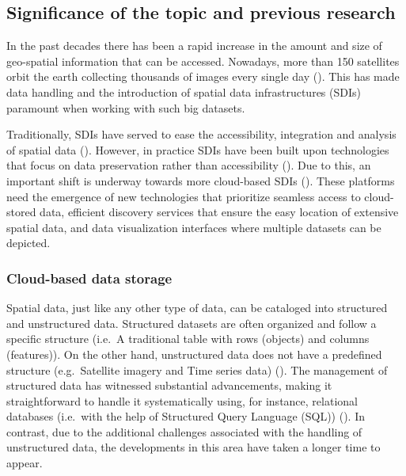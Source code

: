 \documentclass[
  oneside,
  open=any]{scrbook}
\begin{document}
\subsection{Significance of the topic and previous
research}\label{significance-of-the-topic-and-previous-research}

In the past decades there has been a rapid increase in the amount and
size of geo-spatial information that can be accessed. Nowadays, more
than 150 satellites orbit the earth collecting thousands of images every
single day (). This
has made data handling and the introduction of spatial data
infrastructures (SDIs) paramount when working with such big datasets.

Traditionally, SDIs have served to ease the accessibility, integration
and analysis of spatial data
(). However, in practice SDIs have been built upon technologies that
focus on data preservation rather than accessibility
(). Due to this,
an important shift is underway towards more cloud-based SDIs
(). These
platforms need the emergence of new technologies that prioritize
seamless access to cloud-stored data, efficient discovery services that
ensure the easy location of extensive spatial data, and data
visualization interfaces where multiple datasets can be depicted.

\subsubsection*{Cloud-based data
storage}\label{cloud-based-data-storage}

Spatial data, just like any other type of data, can be cataloged into
structured and unstructured data. Structured datasets are often
organized and follow a specific structure (i.e.~A traditional table with
rows (objects) and columns (features)). On the other hand, unstructured
data does not have a predefined structure (e.g.~Satellite imagery and
Time series data) (). The management of structured data has witnessed
substantial advancements, making it straightforward to handle it
systematically using, for instance, relational databases (i.e.~with the
help of Structured Query Language (SQL))
(). In
contrast, due to the additional challenges associated with the handling
of unstructured data, the developments in this area have taken a longer
time to appear.
\end{document}
